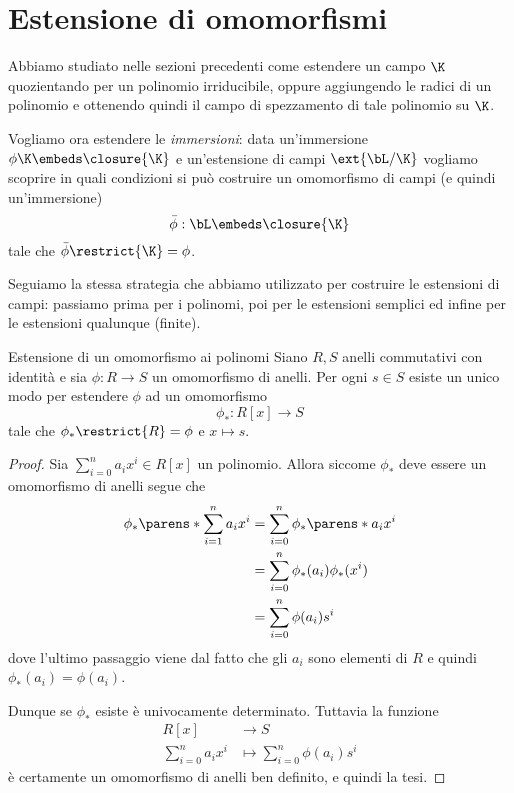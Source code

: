 \section{Estensione di omomorfismi}

Abbiamo studiato nelle sezioni precedenti come estendere un campo $\K$ quozientando per un polinomio irriducibile, oppure aggiungendo le radici di un polinomio e ottenendo quindi il campo di spezzamento di tale polinomio su $\K$.

Vogliamo ora estendere le \emph{immersioni}: data un'immersione $\phi \K \embeds \closure{\K}$ e un'estensione di campi $\ext{\bL / \K}$ vogliamo scoprire in quali condizioni si può costruire un omomorfismo di campi (e quindi un'immersione) \[
    \bar\phi : \bL \embeds \closure{\K} 
\] tale che $\bar\phi\restrict{\K} = \phi$.

Seguiamo la stessa strategia che abbiamo utilizzato per costruire le estensioni di campi: passiamo prima per i polinomi, poi per le estensioni semplici ed infine per le estensioni qualunque (finite).

\begin{theorem}
    {Estensione di un omomorfismo ai polinomi}{}
    Siano $R, S$ anelli commutativi con identità e sia $\phi : R \to S$ un omomorfismo di anelli. Per ogni $s \in S$ esiste un unico modo per estendere $\phi$ ad un omomorfismo \[
        \phi_\ast : R[x] \to S
    \] tale che $\phi_\ast\restrict{R} = \phi$ e $x \mapsto s$. 
\end{theorem}
\begin{proof}
    Sia $\sum_{i=0}^n a_ix^i \in R[x]$ un polinomio. Allora siccome $\phi_\ast$ deve essere un omomorfismo di anelli segue che \begin{align*}
        \phi_\ast\parens*{\sum_{i=1}^n a_ix^i} &= \sum_{i=0}^n \phi_\ast\parens*{a_ix^i}\\
        &= \sum_{i=0}^n \phi_\ast(a_i)\phi_\ast(x^i)\\
        &= \sum_{i=0}^n \phi(a_i)s^i
    \end{align*} dove l'ultimo passaggio viene dal fatto che gli $a_i$ sono elementi di $R$ e quindi $\phi_\ast(a_i) = \phi(a_i)$.
    
    Dunque se $\phi_\ast$ esiste è univocamente determinato. Tuttavia la funzione \begin{align*}
        R[x] &\to S\\
        \sum_{i=0}^n a_ix^i &\mapsto \sum_{i=0}^n \phi(a_i)s^i
    \end{align*} è certamente un omomorfismo di anelli ben definito, e quindi la tesi.
\end{proof}

